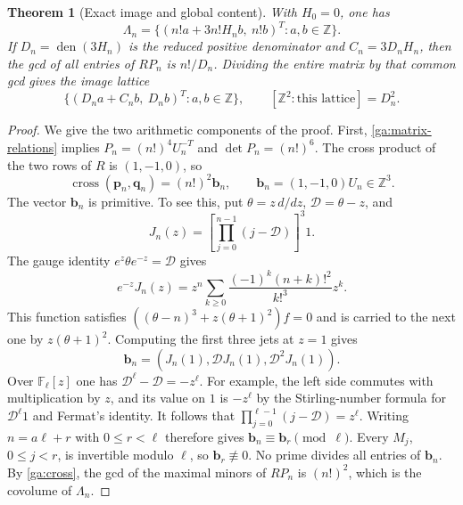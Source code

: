 \documentclass[11pt,a4paper]{article}
\numberwithin{equation}{section}
\newtheorem{theorem}{Theorem}[section]
\theoremstyle{definition}
\theoremstyle{remark}
\newcommand{\Z}{\mathbb Z}
\begin{document}
\begin{theorem}[Exact image and global content]
\label{ga:lattice}
With $H_0=0$, one has
\begin{equation}\label{ga:lattice-image}
 \Lambda_n=
 \{(n!a+3n!H_nb,\ n!b)^T:a,b\in\Z\}.
\end{equation}
If
$D_n=\operatorname{den}(3H_n)$ is the reduced positive denominator
and $C_n=3D_nH_n$, then the gcd of all entries of $RP_n$ is
$n!/D_n$.  Dividing the entire matrix by that common gcd gives
the image lattice
\begin{equation}\label{ga:normalized-lattice}
 \{(D_na+C_nb,\ D_nb)^T:a,b\in\Z\},
 \qquad [\Z^2:\text{this lattice}]=D_n^2.
\end{equation}
\end{theorem}
\begin{proof}
We give the two arithmetic components of the proof.
First, \eqref{ga:matrix-relations} implies
$P_n=(n!)^4U_n^{-T}$ and $\det P_n=(n!)^6$.
The cross product of the two rows of $R$ is $(1,-1,0)$, so
\begin{equation}\label{ga:cross}
 \operatorname{cross}(\mathbf p_n,\mathbf q_n)
       =(n!)^2\mathbf b_n,\qquad
 \mathbf b_n=(1,-1,0)U_n\in\Z^3.
\end{equation}
The vector $\mathbf b_n$ is primitive.  To see this, put
$\theta=z\,d/dz$, $\mathscr D=\theta-z$, and
\[
 J_n(z)=\left[\prod_{j=0}^{n-1}(j-\mathscr D)\right]^3 1.
\]
The gauge identity $e^z\theta e^{-z}=\mathscr D$ gives
\[
 e^{-z}J_n(z)
 =z^n\sum_{k\ge0}\frac{(-1)^k(n+k)!^2}{k!^3}z^k.
\]
This function satisfies
$((\theta-n)^3+z(\theta+1)^2)f=0$ and is carried to the
next one by $z(\theta+1)^2$.
Computing the first three jets at $z=1$ gives
\[
 \mathbf b_n=(J_n(1),\mathscr D J_n(1),\mathscr D^2J_n(1)).
\]
Over $\mathbb F_\ell[z]$ one has
$\mathscr D^\ell-\mathscr D=-z^\ell$.
For example, the left side commutes with multiplication by $z$,
and its value on $1$ is $-z^\ell$ by the Stirling-number formula
for $\mathscr D^\ell1$ and Fermat's identity.
It follows that
$\prod_{j=0}^{\ell-1}(j-\mathscr D)=z^\ell$.
Writing $n=a\ell+r$ with $0\le r<\ell$ therefore gives
$\mathbf b_n\equiv\mathbf b_r\pmod\ell$.
Every $M_j$, $0\le j<r$, is invertible modulo $\ell$, so
$\mathbf b_r\not\equiv0$.  No prime divides all entries of
$\mathbf b_n$.
By \eqref{ga:cross}, the gcd of the maximal minors of $RP_n$
is $(n!)^2$, which is the covolume of $\Lambda_n$.


\end{proof}
\end{document}
